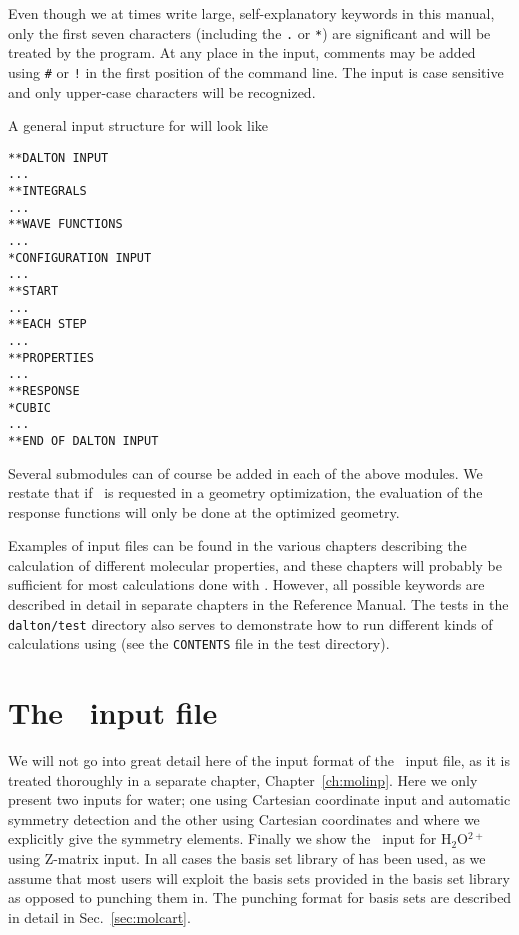 Even though we at times write large, self-explanatory keywords in this
manual, only the first seven characters (including the \verb|.| or
\verb|*|) are significant and will be
treated by the program. At any
place in the input, comments may be added using
\verb|#| or \verb|!|
in the first position of the command line. The input is case sensitive
and only upper-case characters will be recognized.

A general input structure for {\dalton} will look like

\begin{verbatim}
**DALTON INPUT
...
**INTEGRALS
...
**WAVE FUNCTIONS
...
*CONFIGURATION INPUT
...
**START
...
**EACH STEP
...
**PROPERTIES
...
**RESPONSE
*CUBIC
...
**END OF DALTON INPUT
\end{verbatim}

Several submodules can of course be added in each of the above
modules. We restate that if \resp\ is requested in a geometry
optimization, the evaluation of the response functions will only be
done at the optimized geometry.

Examples of input files can be found in the various chapters
describing the calculation of different molecular properties, and
these chapters will probably be sufficient for most calculations done
with {\dalton}. However, all possible keywords are described in detail
in separate chapters in the Reference Manual. The tests in the
\verb|dalton/test| directory also serves to demonstrate how to run
different kinds of calculations using {\dalton} (see the
\verb|CONTENTS| file in the test directory).

\section{The \mol\ input file}

We will not go into great detail here of the input format of the \mol\ input
file, as it is treated thoroughly in a separate chapter,
Chapter~\ref{ch:molinp}. Here we only present two inputs for
water; one
using Cartesian coordinate input and
automatic symmetry detection and
the other using Cartesian coordinates and where we explicitly give the
symmetry elements. Finally we show the \mol\ input for H$_{2}$O$^{2+}$
using Z-matrix input. In
all cases the basis set library of {\dalton} has been used, as we
assume that most users will exploit the basis sets provided in the basis
set library as opposed to punching them in. The punching
format for basis sets are described in detail in Sec.~\ref{sec:molcart}.

